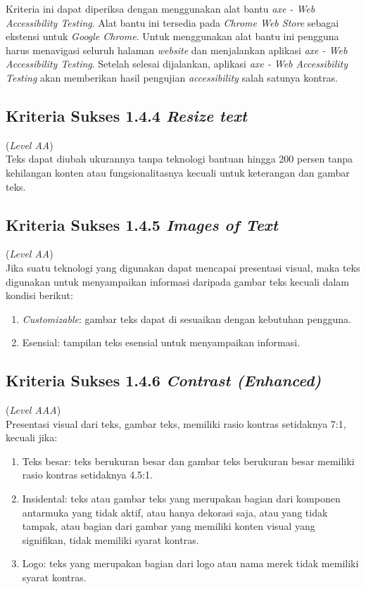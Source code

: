Kriteria ini dapat diperiksa dengan menggunakan alat bantu \textit{axe - Web Accessibility Testing}. Alat bantu ini tersedia pada \textit{Chrome Web Store} sebagai ekstensi untuk \textit{Google Chrome}. Untuk menggunakan alat bantu ini pengguna harus menavigasi seluruh halaman \textit{website} dan menjalankan aplikasi \textit{axe - Web Accessibility Testing}. Setelah selesai dijalankan, aplikasi \textit{axe - Web Accessibility Testing} akan memberikan hasil pengujian \textit{accessibility} salah satunya kontras.

\subsection{Kriteria Sukses 1.4.4 \textit{Resize text}}
\label{subsec:kriteria_1.4.4}
(\textit{Level AA}) \\

Teks dapat diubah ukurannya tanpa teknologi bantuan hingga 200 persen tanpa kehilangan konten atau fungsionalitasnya kecuali untuk keterangan dan gambar teks.

\subsection{Kriteria Sukses 1.4.5 \textit{Images of Text}}
\label{subsec:kriteria_1.4.5}
(\textit{Level AA}) \\

Jika suatu teknologi yang digunakan dapat mencapai presentasi visual, maka teks digunakan untuk menyampaikan informasi daripada gambar teks kecuali dalam kondisi berikut:

\begin{enumerate}
	\item \textit{Customizable}: gambar teks dapat di sesuaikan dengan kebutuhan pengguna.
	\item Esensial: tampilan teks esensial untuk menyampaikan informasi.
\end{enumerate}

\subsection{Kriteria Sukses 1.4.6 \textit{Contrast (Enhanced)}}
\label{subsec:kriteria_1.4.6}
(\textit{Level AAA}) \\

Presentasi visual dari teks, gambar teks, memiliki rasio kontras setidaknya 7:1, kecuali jika:

\begin{enumerate}
	\item Teks besar: teks berukuran besar dan gambar teks berukuran besar memiliki rasio kontras setidaknya 4.5:1.
	\item Insidental: teks atau gambar teks yang merupakan bagian dari komponen antarmuka yang tidak aktif, atau hanya dekorasi saja, atau yang tidak tampak, atau bagian dari gambar yang memiliki konten visual yang signifikan, tidak memiliki syarat kontras.
	\item Logo: teks yang merupakan bagian dari logo atau nama merek tidak memiliki syarat kontras.
\end{enumerate}

